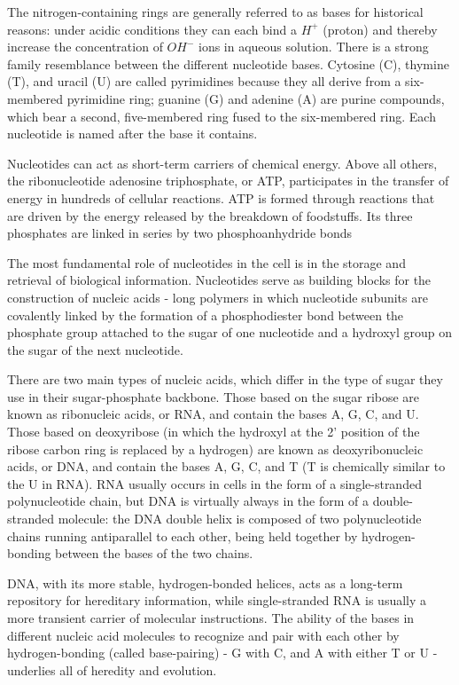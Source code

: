 The nitrogen-containing rings are generally referred to as bases for historical
reasons: under acidic conditions they can each bind a $H^{+}$ (proton)
and thereby increase the concentration of $OH^{-}$ ions in aqueous solution.
There is a strong family resemblance between the different nucleotide
bases. Cytosine (C), thymine (T), and uracil (U) are called pyrimidines
because they all derive from a six-membered pyrimidine ring; guanine (G)
and adenine (A) are purine compounds, which bear a second, five-membered
ring fused to the six-membered ring. Each nucleotide is named
after the base it contains.

Nucleotides can act as short-term carriers of chemical energy. Above all
others, the ribonucleotide adenosine triphosphate, or ATP,
participates in the transfer of energy in hundreds of cellular reactions.
ATP is formed through reactions that are driven by the energy released by
the breakdown of foodstuffs. Its three phosphates are linked in series by
two phosphoanhydride bonds

The most fundamental role of nucleotides in the cell is in the storage and
retrieval of biological information. Nucleotides serve as building blocks
for the construction of nucleic acids - long polymers in which nucleotide
subunits are covalently linked by the formation of a phosphodiester bond
between the phosphate group attached to the sugar of one nucleotide
and a hydroxyl group on the sugar of the next nucleotide.

There are two main types of nucleic acids, which differ in the type of
sugar they use in their sugar-phosphate backbone. Those based on the
sugar ribose are known as ribonucleic acids, or RNA, and contain the
bases A, G, C, and U. Those based on deoxyribose (in which the hydroxyl
at the 2' position of the ribose carbon ring is replaced by a hydrogen)
are known as deoxyribonucleic acids, or DNA, and contain the bases A, G, C, and T
(T is chemically similar to the U in RNA).
RNA usually occurs in cells in the form of a single-stranded polynucleotide chain,
but DNA is virtually always in the form
of a double-stranded molecule: the DNA double helix is composed of
two polynucleotide chains running antiparallel to each other, being held
together by hydrogen-bonding between the bases of the two chains.

DNA, with its more stable, hydrogen-bonded
helices, acts as a long-term repository for hereditary information, while
single-stranded RNA is usually a more transient carrier of molecular
instructions. The ability of the bases in different nucleic acid molecules
to recognize and pair with each other by hydrogen-bonding (called base-pairing)
- G with C, and A with either T or U - underlies all of heredity and
evolution.

